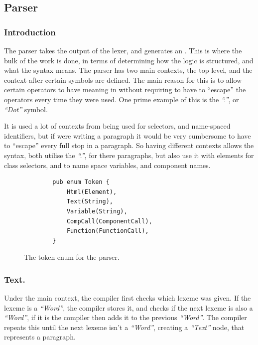 \subsection{Parser}

\subsubsection{Introduction}
The parser takes the output of the lexer, and generates an . This is where the bulk of the work is done, in terms of determining how the logic is structured, and what the syntax means. The parser has two main contexts, the top level, and the context after certain symbols are defined. The main reason for this is to allow certain operators to have meaning in without requiring \you{} to have to ``escape'' the operators every time they were used. One prime example of this is the \textit{``.''}, or \textit{``Dot''} symbol.

It is used a lot of contexts from being used for  selectors, and name-spaced identifiers, but if \you{} were writing a paragraph it would be very cumbersome to have to ``escape'' every full stop in a paragraph. So having different contexts allows the syntax, both utilise the \textit{``.''}, for there paragraphs, but also use it with elements for  class selectors, and to name space variables, and component names.

\begin{figure}[!htbp]
    \begin{verbatim}
        pub enum Token {
            Html(Element),
            Text(String),
            Variable(String),
            CompCall(ComponentCall),
            Function(FunctionCall),
        }
    \end{verbatim}
    \caption{The token enum for the parser.}
    \label{fig:tokenEnum}
\end{figure}

\subsubsection{Text.}
Under the main context, the compiler first checks which lexeme was given. If the lexeme is a \textit{``Word''}, the compiler stores it, and checks if the next lexeme is also a \textit{``Word''}, if it is the compiler then adds it to the previous \textit{``Word''}. The compiler repeats this until the next lexeme isn't a \textit{``Word''}, creating a \textit{``Text''} node, that represents a paragraph.

